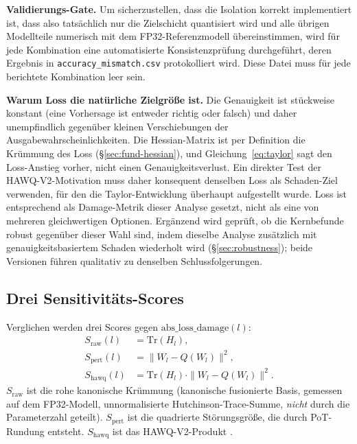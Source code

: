 \textbf{Validierungs-Gate.} Um sicherzustellen, dass die Isolation korrekt implementiert ist, dass also tatsächlich nur die Zielschicht quantisiert wird und alle übrigen Modellteile numerisch mit dem FP32-Referenzmodell übereinstimmen, wird für jede Kombination eine automatisierte Konsistenzprüfung durchgeführt, deren Ergebnis in \texttt{accuracy\_mismatch.csv} protokolliert wird. Diese Datei muss für jede berichtete Kombination leer sein.
\par\medskip

\textbf{Warum Loss die natürliche Zielgröße ist.} Die Genauigkeit ist stückweise konstant (eine Vorhersage ist entweder richtig oder falsch) und daher unempfindlich gegenüber kleinen Verschiebungen der Ausgabewahrscheinlichkeiten. Die Hessian-Matrix ist per Definition die Krümmung des Loss (\S\ref{sec:fund-hessian}), und Gleichung~\eqref{eq:taylor} sagt den Loss-Anstieg vorher, nicht einen Genauigkeitsverlust. Ein direkter Test der HAWQ-V2-Motivation muss daher konsequent denselben Loss als Schaden-Ziel verwenden, für den die Taylor-Entwicklung überhaupt aufgestellt wurde. Loss ist entsprechend als Damage-Metrik dieser Analyse gesetzt, nicht als eine von mehreren gleichwertigen Optionen. Ergänzend wird geprüft, ob die Kernbefunde robust gegenüber dieser Wahl sind, indem dieselbe Analyse zusätzlich mit genauigkeitsbasiertem Schaden wiederholt wird (\S\ref{sec:robustness}); beide Versionen führen qualitativ zu denselben Schlussfolgerungen.

\subsection{Drei Sensitivitäts-Scores}
\label{sec:scores}

Verglichen werden drei Scores gegen $\mathrm{abs\_loss\_damage}(l)$:
\begin{align}
S_{\mathrm{raw}}(l) &= \mathrm{Tr}(H_l), \label{eq:s-raw}\\
S_{\mathrm{pert}}(l) &= \|W_l - Q(W_l)\|^2, \label{eq:s-pert}\\
S_{\mathrm{hawq}}(l) &= \mathrm{Tr}(H_l)\cdot\|W_l - Q(W_l)\|^2. \label{eq:s-hawq}
\end{align}
$S_{\mathrm{raw}}$ ist die rohe kanonische Krümmung (kanonische fusionierte Basis, gemessen auf dem FP32-Modell, unnormalisierte Hutchinson-Trace-Summe, \emph{nicht} durch die Parameterzahl geteilt). $S_{\mathrm{pert}}$ ist die quadrierte Störungsgröße, die durch PoT-Rundung entsteht. $S_{\mathrm{hawq}}$ ist das HAWQ-V2-Produkt \citep{dong_hawqv2_2020}.
\par\medskip

